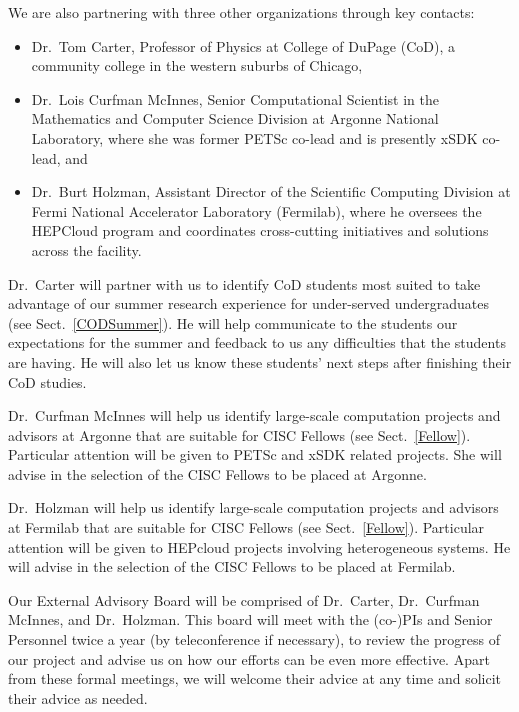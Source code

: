 \documentclass[11pt]{NSFamsart}
\begin{document}
We are also partnering with three other organizations through key contacts:
\begin{itemize}

\item Dr.~Tom Carter, Professor of Physics at College of DuPage (CoD), a community college in the western suburbs of Chicago, 

\item Dr.~Lois Curfman McInnes, Senior Computational Scientist in the Mathematics and Computer Science Division at Argonne National Laboratory, where she was former PETSc co-lead and is presently xSDK co-lead, and

\item Dr.~Burt Holzman, Assistant Director of the Scientific Computing
Division at Fermi National Accelerator Laboratory (Fermilab), where he oversees the
HEPCloud program and coordinates cross-cutting initiatives and solutions
across the facility.

\end{itemize}


Dr.~Carter will partner with us to identify CoD students most suited to take advantage of our summer research experience for under-served undergraduates (see Sect.~\ref{CODSummer}).  He will help communicate to the students our expectations for the summer and feedback to us any difficulties that the students are having.  He will also let us know these students' next steps after finishing their CoD studies.

Dr.~Curfman McInnes will help us identify large-scale computation projects and advisors at Argonne that are suitable for CISC Fellows (see Sect.~\ref{Fellow}).  Particular attention will be given to PETSc and xSDK related projects.  She will advise in the selection of the CISC Fellows to be placed at Argonne.

Dr.~Holzman will help us identify large-scale computation projects and advisors at Fermilab that are suitable for CISC Fellows (see Sect.~\ref{Fellow}).  Particular attention will be given to HEPcloud projects involving heterogeneous systems.  He will advise in the selection of the CISC Fellows to be placed at Fermilab.

Our External Advisory Board will be comprised of Dr.~Carter, Dr.~Curfman McInnes, and Dr.~Holzman.  This board will meet with the (co-)PIs and Senior Personnel twice a year (by teleconference if necessary), to review the progress of our project and advise us on how our efforts can be even more effective.  Apart from these formal meetings, we will welcome their advice at any time and solicit their advice as needed.
\end{document}
